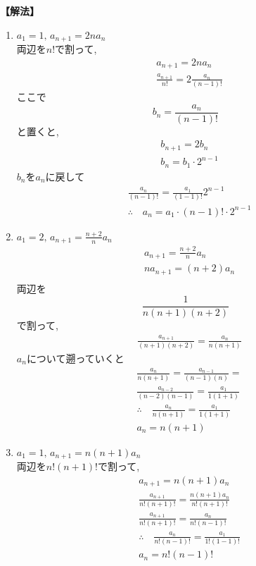     \noindent\textbf{【解法】}
    \begin{enumerate}[label=(\arabic*),parsep=3pt]
      \item $\displaystyle a_1=1,\, a_{n+1}=2na_n$\\
            両辺を$n!$で割って,
            \begin{align*}
              &a_{n+1}=2na_n\\
              &\frac{a_{n+1}}{n!}=2\frac{a_n}{(n-1)!}
            \end{align*}
            ここで
            \[
              b_n=\frac{a_n}{(n-1)!}
            \]
            と置くと,
            \begin{align*} 
              &b_{n+1}=2b_n\\
              &b_n=b_1\cdot 2^{n-1}
            \end{align*}
            $b_n$を$a_n$に戻して
            \begin{align*} 
              &\frac{a_n}{(n-1)!}=\frac{a_1}{(1-1)!}2^{n-1}\\
              &\therefore \quad a_n=a_1 \cdot (n-1)! \cdot 2^{n-1}
            \end{align*}
            
      \item $\displaystyle a_1=2,\, a_{n+1}=\frac{n+2}{n}a_n$
            \begin{align*}
              &a_{n+1}=\frac{n+2}{n}a_n\\
              &na_{n+1}=(n+2)a_n\\
            \end{align*}
            両辺を
            \[
              \displaystyle \frac{1}{n(n+1)(n+2)}
            \]
            で割って,
            \begin{align*}        
              &\frac{a_{n+1}}{(n+1)(n+2)}=\frac{a_{n}}{n(n+1)}
            \end{align*}
            $a_n$について遡っていくと
            \begin{align*}
              &\frac{a_{n}}{n(n+1)}=\frac{a_{n-1}}{(n-1)(n)}=\\
              &\frac{a_{n-2}}{(n-2)(n-1)}=\frac{a_{1}}{1(1+1)}\\
              &\therefore \quad \frac{a_{n}}{n(n+1)}=\frac{a_{1}}{1(1+1)}\\
              &a_n=n(n+1)
            \end{align*}
      \item $\displaystyle a_1=1,\, a_{n+1}=n(n+1)a_n$\\
              両辺を$n!(n+1)!$で割って,
            \begin{align*}
              &a_{n+1}=n(n+1)a_n\\
              &\frac{a_{n+1}}{n!(n+1)!}=\frac{n(n+1)a_n}{n!(n+1)!}\\
              &\frac{a_{n+1}}{n!(n+1)!}=\frac{a_n}{n!(n-1)!}\\
              &\therefore \quad \frac{a_n}{n!(n-1)!}=\frac{a_1}{1!(1-1)!}\\
              &a_n=n!(n-1)!
            \end{align*}
    \end{enumerate}


